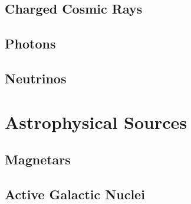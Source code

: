 \subsection*{Charged Cosmic Rays}
\label{sub:rays}

\subsection*{Photons}
\label{sub:photons}

\subsection*{Neutrinos}
\label{sub:neutrinos}

\section{Astrophysical Sources}
\label{sec:sources}

\subsection*{Magnetars}
\label{sub:magnetars}

\subsection*{Active Galactic Nuclei}
\label{sub:nuclei}
